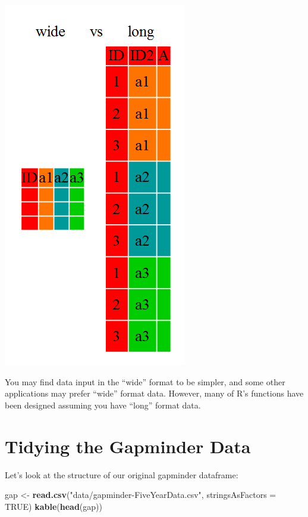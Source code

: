\documentclass[]{book}
\newenvironment{Shaded}{\begin{snugshade}}{\end{snugshade}}
\newcommand{\KeywordTok}[1]{\textcolor[rgb]{0.13,0.29,0.53}{\textbf{#1}}}
\newcommand{\DataTypeTok}[1]{\textcolor[rgb]{0.13,0.29,0.53}{#1}}
\newcommand{\StringTok}[1]{\textcolor[rgb]{0.31,0.60,0.02}{#1}}
\newcommand{\OtherTok}[1]{\textcolor[rgb]{0.56,0.35,0.01}{#1}}
\newcommand{\NormalTok}[1]{#1}
\begin{document}
\begin{center}\includegraphics[width=0.7\linewidth]{img/tidyr-fig1} \end{center}

You may find data input in the ``wide'' format to be simpler, and some
other applications may prefer ``wide'' format data. However, many of R's
functions have been designed assuming you have ``long'' format data.

\section{Tidying the Gapminder Data}\label{tidying-the-gapminder-data}

Let's look at the structure of our original gapminder dataframe:

\begin{Shaded}
\begin{Highlighting}[]
\NormalTok{gap <-}\StringTok{ }\KeywordTok{read.csv}\NormalTok{(}\StringTok{"data/gapminder-FiveYearData.csv"}\NormalTok{, }\DataTypeTok{stringsAsFactors =} \OtherTok{TRUE}\NormalTok{)}
\KeywordTok{kable}\NormalTok{(}\KeywordTok{head}\NormalTok{(gap))}
\end{Highlighting}
\end{Shaded}
\end{document}
